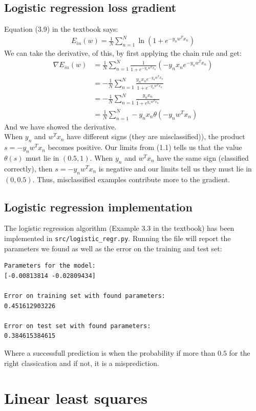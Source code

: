 \documentclass[a4paper]{article}
\def\MeanN{\frac{1}{N}\sum^N_{n=1}}
\begin{document}
\subsection{Logistic regression loss gradient}
Equation (3.9) in the textbook says:
\begin{align*}
E_{in}(w)=\MeanN \ln(1+e^{-y_n w^T x_n})
\end{align*}
We can take the derivative, of this, by first applying the chain rule and get:
\begin{align*}
\nabla E_{in}(w)&=\MeanN \frac{1}{1+e^{-y_n w^T x_n}}(-y_nx_ne^{-y_n w^T x_n}) \\
&=-\MeanN \frac{y_nx_ne^{-y_n w^T x_n}}{1+e^{-y_n w^T x_n}} \\
&=-\MeanN \frac{y_nx_n}{1+e^{y_n w^T x_n}} \\
&=\MeanN -y_nx_n\theta(-y_nw^Tx_n)
\end{align*}
And we have showed the derivative. \\
When $y_n$ and $w^Tx_n$ have different signs (they are misclassified)), the product $s=-y_nw^Tx_n$ becomes positive. Our limits from (1.1) tells us that the value $\theta(s)$ must lie in $(0.5,1)$. When $y_n$ and $w^Tx_n$ have the same sign (classified correctly), then $s=-y_nw^Tx_n$ is negative and our limits tell us they must lie in $(0, 0.5)$. Thus, misclassified examples contribute more to the gradient.

\subsection{Logistic regression implementation}
The logistic regression algorithm (Example 3.3 in the textbook) has been implemented in \texttt{src/logistic\_regr.py}. Running the file will report the parameters we found as well as the error on the training and test set:
\begin{verbatim}
Parameters for the model:
[-0.00813814 -0.02809434]

Error on training set with found parameters:
0.451612903226

Error on test set with found parameters:
0.384615384615
\end{verbatim}
Where a successfull prediction is when the probability if more than $0.5$ for the right classication and if not, it is a misprediction.

\section{Linear least squares}
\end{document}
